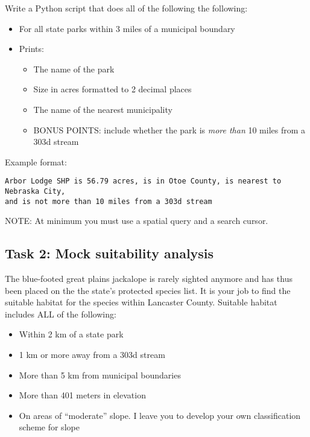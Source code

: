 \documentclass[]{article}
\providecommand{\tightlist}{%
  \setlength{\itemsep}{0pt}\setlength{\parskip}{0pt}}
\begin{document}
Write a Python script that does all of the following the following:

\begin{itemize}
\tightlist
\item
  For all state parks within 3 miles of a municipal boundary
\item
  Prints:

  \begin{itemize}
  \tightlist
  \item
    The name of the park
  \item
    Size in acres formatted to 2 decimal places
  \item
    The name of the nearest municipality
  \item
    BONUS POINTS: include whether the park is \emph{more than} 10 miles
    from a 303d stream
  \end{itemize}
\end{itemize}

Example format:

\begin{verbatim}
Arbor Lodge SHP is 56.79 acres, is in Otoe County, is nearest to Nebraska City, 
and is not more than 10 miles from a 303d stream
\end{verbatim}

NOTE: At minimum you must use a spatial query and a search cursor.

\hypertarget{task-2-mock-suitability-analysis}{%
\subsection{Task 2: Mock suitability
analysis}\label{task-2-mock-suitability-analysis}}

The blue-footed great plains jackalope is rarely sighted anymore and has
thus been placed on the the state's protected species list. It is your
job to find the suitable habitat for the species within Lancaster
County. Suitable habitat includes ALL of the following:

\begin{itemize}
\tightlist
\item
  Within 2 km of a state park
\item
  1 km or more away from a 303d stream
\item
  More than 5 km from municipal boundaries
\item
  More than 401 meters in elevation
\item
  On areas of ``moderate'' slope. I leave you to develop your own
  classification scheme for slope
\end{itemize}
\end{document}
